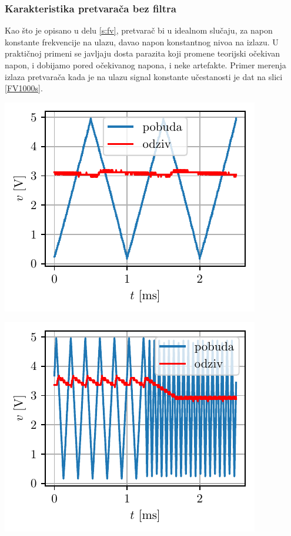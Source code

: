 \documentclass[a4paper, 12pt, diplomski]{etf}
\begin{document}
\subsubsection{Karakteristika pretvarača bez filtra}

Kao što je opisano u delu \ref{s:fv}, pretvarač bi u idealnom slučaju, za napon konstante frekvencije na ulazu, davao napon konstantnog nivoa na izlazu. U praktičnoj primeni se javljaju dosta parazita koji promene teorijski očekivan napon, i dobijamo pored očekivanog napona, i neke artefakte. Primer merenja izlaza pretvarača kada je na ulazu signal konstante učestanosti je dat na slici \ref{FV1000s}.


\begin{center}
\begin{minipage}{0.45\textwidth}
\centering
\includegraphics[scale=1]{fig_osc/FV1000s.pdf}
\label{FV1000s}
\end{minipage}\hfill
\begin{minipage}{0.45\textwidth}
\includegraphics[scale=1]{fig_osc/FV1000d.pdf} 
\label{FV1000d} 
\end{minipage}
\end{center}
\end{document}
